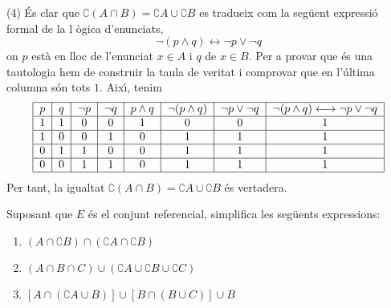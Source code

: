 \begin{solucio}
(4) \'{E}s clar que $\complement \left( A\cap B\right) =\complement A\cup
\complement B$ es tradueix com la seg\"{u}ent expressi\'{o} formal de la l%
\`{o}gica d'enunciats,%
\begin{equation*}
\lnot (p\wedge q)\longleftrightarrow \lnot p\vee \lnot q
\end{equation*}%
on $p$ est\`{a} en lloc de l'enunciat $x\in A$ i $q$ de $x\in B$. Per a
provar que \'{e}s una tautologia hem de construir la taula de veritat i
comprovar que en l'\'{u}ltima columna s\'{o}n tots $1$. Aix\'{\i}, tenim%
\begin{equation*}
\begin{tabular}{|c|c|c|c|c|c|c|c|}
\hline
$p$ & $q$ & $\lnot p$ & $\lnot q$ & $p\wedge q$ & $\lnot (p\wedge q)$ & $%
\lnot p\vee \lnot q$ & $\lnot (p\wedge q)\longleftrightarrow \lnot p\vee
\lnot q$ \\ \hline
$1$ & $1$ & $0$ & $0$ & $1$ & $0$ & $0$ & $1$ \\ \hline
$1$ & $0$ & $0$ & $1$ & $0$ & $1$ & $1$ & $1$ \\ \hline
$0$ & $1$ & $1$ & $0$ & $0$ & $1$ & $1$ & $1$ \\ \hline
$0$ & $0$ & $1$ & $1$ & $0$ & $1$ & $1$ & $1$ \\ \hline
\end{tabular}%
\end{equation*}%
Per tant, la igualtat $\complement \left( A\cap B\right) =\complement A\cup
\complement B$ \'{e}s vertadera.
\end{solucio}

\begin{exer}
Suposant que $E$ \'{e}s el conjunt referencial, simplifica les seg\"{u}ents
expressions:

\begin{enumerate}
\item $(A\cap \complement B)\cap (\complement A\cap \complement B)$

\item $(A\cap B\cap C)\cup (\complement A\cup \complement B\cup \complement
C)$

\item $\left[ A\cap (\complement A\cup B)\right] \cup \left[ B\cap (B\cup C)%
\right] \cup B$
\end{enumerate}
\end{exer}

